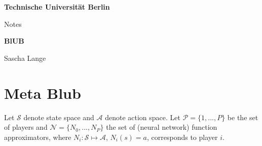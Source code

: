 \documentclass[a4paper, 11pt]{article}
\newcommand{\blatt}{}
\begin{document}
 
	
	\rhead[ \leftmark   ]{\textbf{}}
	\chead[\leftmark   ]{\leftmark{}}
	\lhead[\textbf{}]{\blatt}
	
	
	\thispagestyle{empty}
	\begin{center}
		
		\vspace*{1.4cm}
		{\LARGE \textbf{Technische Universität Berlin}}
		
		\vspace{0.5cm}
		
		{\large Notes\\[1mm]}

		
		
		\vspace{1.0cm}
		{\LARGE \textbf{BlUB}}\\
		\vspace*{1.0cm}
		
		
		Sascha Lange%
		
		
		
	\end{center}
	
	\renewcommand{\labelenumi}{\alph{enumi})}
	\renewcommand{\labelenumii}{(\roman{enumii})}
	\renewcommand{\labelenumiii}{\arabic{enumiii}.}
	\renewcommand{\contentsname}{Table of Contents}
	\newpage
	\newtheorem{Cor}{Corollary}
	\newtheorem{Theorem}{Theorem}
	\newtheorem{Def}{Definition}
	\newtheorem{Prop}{Proposition}
	\newtheorem{Lemma}{Lemma}
	\section*{Meta Blub}
	
	Let $\mathcal{S}$ denote state space and $\mathcal{A}$ denote action space. Let $\mathcal{P}=\{1,...,P\}$ be  the set of players and $\mathcal{N}=\{N_0,...,N_{P}\}$ the set of (neural network) function approximators, where $N_i : \mathcal{S} \mapsto \mathcal{A}$, $N_i(s) = a$, %
	corresponds to player $i$. \\
	
\end{document}

